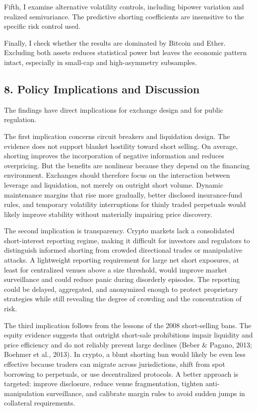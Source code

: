 \documentclass[
]{article}
\begin{document}
Fifth, I examine alternative volatility controls, including bipower
variation and realized semivariance. The predictive shorting
coefficients are insensitive to the specific risk control used.

Finally, I check whether the results are dominated by Bitcoin and Ether.
Excluding both assets reduces statistical power but leaves the economic
pattern intact, especially in small-cap and high-asymmetry subsamples.

\subsection{8. Policy Implications and
Discussion}\label{8-policy-implications-and-discussion}

The findings have direct implications for exchange design and for public
regulation.

The first implication concerns circuit breakers and liquidation design.
The evidence does not support blanket hostility toward short selling. On
average, shorting improves the incorporation of negative information and
reduces overpricing. But the benefits are nonlinear because they depend
on the financing environment. Exchanges should therefore focus on the
interaction between leverage and liquidation, not merely on outright
short volume. Dynamic maintenance margins that rise more gradually,
better disclosed insurance-fund rules, and temporary volatility
interruptions for thinly traded perpetuals would likely improve
stability without materially impairing price discovery.

The second implication is transparency. Crypto markets lack a
consolidated short-interest reporting regime, making it difficult for
investors and regulators to distinguish informed shorting from crowded
directional trades or manipulative attacks. A lightweight reporting
requirement for large net short exposures, at least for centralized
venues above a size threshold, would improve market surveillance and
could reduce panic during disorderly episodes. The reporting could be
delayed, aggregated, and anonymized enough to protect proprietary
strategies while still revealing the degree of crowding and the
concentration of risk.

The third implication follows from the lessons of the 2008 short-selling
bans. The equity evidence suggests that outright short-sale prohibitions
impair liquidity and price efficiency and do not reliably prevent large
declines (Beber \& Pagano, 2013; Boehmer et al., 2013). In crypto, a
blunt shorting ban would likely be even less effective because traders
can migrate across jurisdictions, shift from spot borrowing to
perpetuals, or use decentralized protocols. A better approach is
targeted: improve disclosure, reduce venue fragmentation, tighten
anti-manipulation surveillance, and calibrate margin rules to avoid
sudden jumps in collateral requirements.
\end{document}
